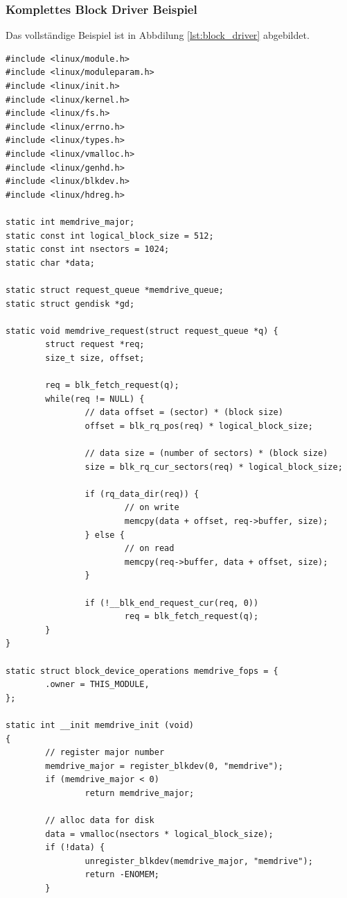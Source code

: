 \subsubsection{Komplettes Block Driver Beispiel}

Das vollständige Beispiel ist in Abbdilung \ref{lst:block_driver} abgebildet.

\begin{lstlisting}[label=lst:block_driver,caption=Block Driver]
#include <linux/module.h>
#include <linux/moduleparam.h>
#include <linux/init.h>
#include <linux/kernel.h>
#include <linux/fs.h>
#include <linux/errno.h>
#include <linux/types.h>
#include <linux/vmalloc.h>
#include <linux/genhd.h>
#include <linux/blkdev.h>
#include <linux/hdreg.h>

static int memdrive_major;
static const int logical_block_size = 512;
static const int nsectors = 1024;
static char *data;

static struct request_queue *memdrive_queue;
static struct gendisk *gd;

static void memdrive_request(struct request_queue *q) {
        struct request *req;
        size_t size, offset;

        req = blk_fetch_request(q);
        while(req != NULL) {
                // data offset = (sector) * (block size)
                offset = blk_rq_pos(req) * logical_block_size;

                // data size = (number of sectors) * (block size)
                size = blk_rq_cur_sectors(req) * logical_block_size;

                if (rq_data_dir(req)) {
                        // on write
                        memcpy(data + offset, req->buffer, size);
                } else {
                        // on read
                        memcpy(req->buffer, data + offset, size);
                }

                if (!__blk_end_request_cur(req, 0))
                        req = blk_fetch_request(q);
        }
}

static struct block_device_operations memdrive_fops = {
        .owner = THIS_MODULE,
};

static int __init memdrive_init (void)
{
        // register major number
        memdrive_major = register_blkdev(0, "memdrive");
        if (memdrive_major < 0)
                return memdrive_major;

        // alloc data for disk
        data = vmalloc(nsectors * logical_block_size);
        if (!data) {
                unregister_blkdev(memdrive_major, "memdrive");
                return -ENOMEM;
        }


\end{lstlisting}
